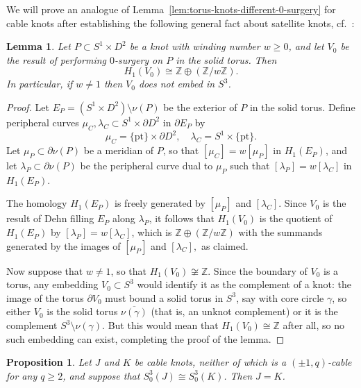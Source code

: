 \documentclass[11pt]{amsart}
\newtheorem {lemma}[theorem]{Lemma}
\newtheorem {proposition}[theorem]{Proposition}
\numberwithin{equation}{section}
\numberwithin{theorem}{section}
\theoremstyle{definition}
\newcommand{\Z}{\mathbb{Z}}
\newcommand{\pt}{\mathrm{pt}}
\begin{document}
We will  prove an analogue of Lemma~\ref{lem:torus-knots-different-0-surgery} for cable knots after establishing  the following general fact about satellite knots, cf.\ \cite[Lemma~3.3]{gordon}:

\begin{lemma} \label{lem:pattern-0-homology}
Let $P \subset S^1\times D^2$ be a knot with winding number $w \geq 0$, and let $V_0$ be the result of performing $0$-surgery on $P$ in the solid torus. Then \[H_1(V_0) \cong \Z \oplus (\Z/w\Z).\]  In particular, if $w \neq 1$ then $V_0$ does not embed in $S^3$.
\end{lemma}

\begin{proof}
Let $E_P = (S^1\times D^2) \setminus \nu(P)$ be the exterior of $P$ in the solid torus.  Define peripheral curves $\mu_C,\lambda_C \subset S^1 \times \partial D^2$ in $\partial E_P$ by
\[\mu_C = \{\pt\} \times \partial D^2, \quad \lambda_C = S^1 \times \{\pt\}.\]
Let $\mu_P \subset \partial \nu(P)$ be a meridian of $P$, so that $[\mu_C] = w[\mu_P]$ in $H_1(E_P)$, and let $\lambda_P \subset \partial \nu(P)$ be the peripheral curve dual to $\mu_P$ such that $[\lambda_P] = w[\lambda_C]$ in $H_1(E_P)$. 

The homology $H_1(E_P)$ is freely generated by $[\mu_P]$ and $[\lambda_C]$. Since $V_0$ is the result of Dehn filling $E_P$ along $\lambda_P$, it follows that $H_1(V_0)$ is the quotient of $H_1(E_P)$ by $[\lambda_P] = w[\lambda_C]$, which is $\Z \oplus (\Z/w\Z)$ with the summands generated by the images of $[\mu_P]$ and $[\lambda_C],$ as claimed.

Now suppose that $w \neq 1$, so that $H_1(V_0) \not\cong \Z$.  Since the boundary of $V_0$ is a torus, any embedding $V_0 \subset S^3$ would identify it as the complement of a knot: the image of the torus $\partial V_0$ must bound a solid torus in $S^3$, say with core circle $\gamma$, so either $V_0$ is the solid torus $\overline{\nu(\gamma)}$ (that is, an unknot complement) or it is the complement $S^3 \setminus \nu(\gamma)$.  But this would mean that $H_1(V_0) \cong \Z$ after all, so no such embedding can exist, completing the proof of the lemma.
\end{proof}

\begin{proposition} \label{prop:cables-different-0-surgery}
Let $J$ and $K$ be cable knots, neither of which is a $(\pm1,q)$-cable for any $q\geq 2$, and suppose that $S^3_0(J) \cong S^3_0(K)$.  Then $J=K$.
\end{proposition}
\end{document}
